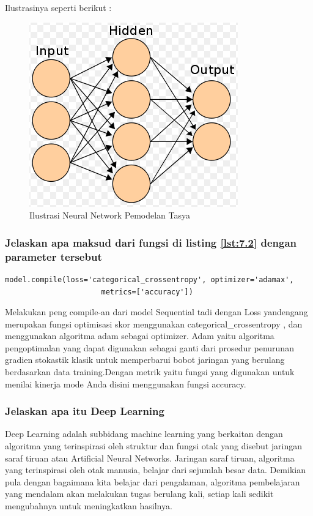 Ilustrasinya seperti berikut :\\
\begin{figure}[ht]
\centering
\includegraphics[scale=0.5]{figures/Chapter 7/1164086/Teori/chapter7tasya6.png}
\caption{Ilustrasi Neural Network Pemodelan Tasya}
\label{Teori}
\end{figure}

\subsubsection{Jelaskan apa maksud dari fungsi di listing \ref{lst:7.2} dengan parameter tersebut}
\begin{lstlisting}[caption=Compile model,label={lst:7.2}]
	model.compile(loss='categorical_crossentropy', optimizer='adamax',
	                  metrics=['accuracy'])
\end{lstlisting}
Melakukan peng compile-an dari model Sequential tadi dengan Loss yandengang merupakan fungsi optimisasi skor  menggunakan categorical\_crossentropy , dan menggunakan algoritma adam sebagai optimizer. Adam yaitu algoritma pengoptimalan yang dapat digunakan sebagai ganti dari prosedur penurunan gradien stokastik klasik untuk memperbarui bobot jaringan yang berulang berdasarkan data training.Dengan metrik yaitu fungsi yang digunakan untuk menilai kinerja mode Anda disini menggunakan fungsi accuracy.

\subsubsection{Jelaskan apa itu Deep Learning}
Deep Learning  adalah subbidang machine learning yang berkaitan dengan algoritma yang terinspirasi oleh struktur dan fungsi otak yang disebut jaringan saraf tiruan atau Artificial Neural Networks. Jaringan saraf tiruan, algoritma yang terinspirasi oleh otak manusia, belajar dari sejumlah besar data. Demikian pula dengan bagaimana kita belajar dari pengalaman, algoritma pembelajaran yang mendalam akan melakukan tugas berulang kali, setiap kali sedikit mengubahnya untuk meningkatkan hasilnya.

